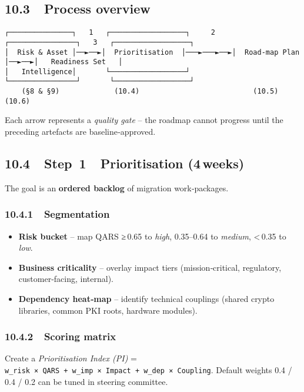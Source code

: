 \documentclass[
  english,
]{article}
\providecommand{\tightlist}{%
  \setlength{\itemsep}{0pt}\setlength{\parskip}{0pt}}
\begin{document}
\subsection{10.3~~Process overview}\label{process-overview}

\begin{verbatim}
┌───────────────┐   1   ┌──────────────────┐     2     ┌────────────────┐   3   ┌──────────────────┐
│  Risk & Asset │──►──►│  Prioritisation  │───►───►──►│  Road‑map Plan  │──►──►│   Readiness Set   │
│   Intelligence│       └──────────────────┘           └────────────────┘       └──────────────────┘
    (§8 & §9)             (10.4)                           (10.5)                   (10.6)
\end{verbatim}

Each arrow represents a \emph{quality gate} -- the roadmap cannot
progress until the preceding artefacts are baseline‑approved.

\subsection{10.4~~Step~1~~Prioritisation
(4\,weeks)}\label{step-1-prioritisation-4-weeks}

The goal is an \textbf{ordered backlog} of migration work‑packages.

\subsubsection{10.4.1~~Segmentation}\label{segmentation}

\begin{itemize}
\tightlist
\item
  \textbf{Risk bucket} -- map QARS ≥\,0.65 to \emph{high}, 0.35--0.64 to
  \emph{medium}, \textless\,0.35 to \emph{low}.
\item
  \textbf{Business criticality} -- overlay impact tiers
  (mission‑critical, regulatory, customer‑facing, internal).
\item
  \textbf{Dependency heat‑map} -- identify technical couplings (shared
  crypto libraries, common PKI roots, hardware modules).
\end{itemize}

\subsubsection{10.4.2~~Scoring matrix}\label{scoring-matrix}

Create a \emph{Prioritisation Index (PI)} =
\texttt{w\_risk\ ×\ QARS\ +\ w\_imp\ ×\ Impact\ +\ w\_dep\ ×\ Coupling}.
Default weights 0.4 / 0.4 / 0.2 can be tuned in steering committee.
\end{document}
